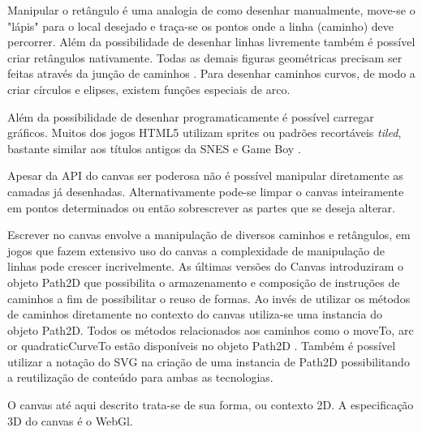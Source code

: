 Manipular o retângulo é uma analogia de como desenhar manualmente,
move-se o "lápis" para o local desejado e traça-se os pontos onde
a linha (caminho) deve percorrer. Além da possibilidade de desenhar linhas
livremente também é possível criar retângulos nativamente. Todas as demais figuras geométricas precisam ser feitas através da junção de caminhos \autocite{mdnCanvas}. Para desenhar caminhos curvos, de modo a criar círculos e elipses, existem funções especiais de arco.

Além da possibilidade de desenhar programaticamente é possível
carregar gráficos. Muitos dos jogos HTML5 utilizam sprites ou
padrões recortáveis \textit{tiled}, bastante similar aos títulos antigos da SNES e Game Boy \autocite{buildingHtml5Game}.

Apesar da API do canvas ser poderosa não é possível manipular diretamente as camadas já desenhadas. Alternativamente pode-se limpar o canvas inteiramente em pontos determinados ou então sobrescrever as partes que se deseja alterar.

Escrever no canvas envolve a manipulação de  diversos caminhos e retângulos, em jogos que fazem extensivo uso do canvas a complexidade de manipulação de linhas pode crescer incrivelmente. As últimas versões do Canvas introduziram o objeto Path2D que possibilita o armazenamento  e composição de instruções de caminhos a fim de possibilitar o reuso de formas. Ao invés de utilizar os métodos de caminhos diretamente no contexto do canvas utiliza-se uma instancia do objeto Path2D. Todos os métodos relacionados aos caminhos como o moveTo, arc or quadraticCurveTo estão disponíveis no objeto Path2D \autocite{mdnCanvas}. Também é possível utilizar a notação do SVG na criação de uma instancia de Path2D possibilitando a reutilização  de conteúdo para ambas as tecnologias.

O canvas até aqui descrito trata-se de sua forma, ou contexto 2D. A
especificação 3D do canvas é o WebGl.

